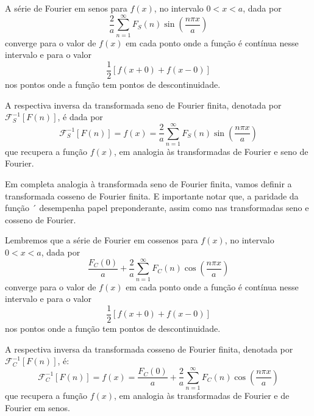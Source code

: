 

A série de Fourier em senos para $f(x)$, no intervalo $0 < x < a$, dada por
$$\dfrac{2}{a} \sum_{n=1}^{\infty} F_S(n) \sin\left(\dfrac{n\pi x}{a}\right)$$
converge para o valor de $f(x)$ em cada ponto onde a função é contínua nesse intervalo e para o valor
$$\dfrac{1}{2}[f(x + 0) + f(x - 0)]$$
nos pontos onde a função tem pontos de descontinuidade.

A respectiva inversa da transformada seno de Fourier finita, denotada por $\mathscr{F}^{-1}_S[F(n)]$, é dada por
$$\mathscr{F}^{-1}_S[F(n)] = f(x) = \dfrac{2}{a} \sum_{n=1}^{\infty} F_S(n) \sin\left(\dfrac{n\pi x}{a}\right)$$
que recupera a função $f(x)$, em analogia às transformadas de Fourier e seno de Fourier.

Em completa analogia à transformada seno de Fourier finita, vamos definir a transformada cosseno de Fourier finita. E importante notar que, a paridade da função ´
desempenha papel preponderante, assim como nas transformadas seno e cosseno de Fourier.



Lembremos que a série de Fourier em cossenos para $f(x)$, no intervalo $0 < x < a$, dada por
$$\dfrac{F_C(0)}{a} +
\dfrac{2}{a} \sum_{n=1}^{\infty} F_C(n) \cos\left(\dfrac{n\pi x}{a}\right)
$$
converge para o valor de $f(x)$ em cada ponto onde a função é contínua nesse intervalo e para o valor
$$\dfrac{1}{2} [f(x + 0) + f(x - 0)]$$
nos pontos onde a função tem pontos de descontinuidade.

A respectiva inversa da transformada cosseno de Fourier finita, denotada por $\mathscr{F}^{-1}_C[F(n)]$, é:
$$\mathscr{F}^{-1}_C[F(n)] = f(x) =
\dfrac{F_C(0)}{a} +
\dfrac{2}{a} \sum_{n=1}^{\infty} F_C(n) \cos\left(\dfrac{n\pi x}{a}\right)$$
que recupera a função $f(x)$, em analogia às transformadas de Fourier e de Fourier em senos.

